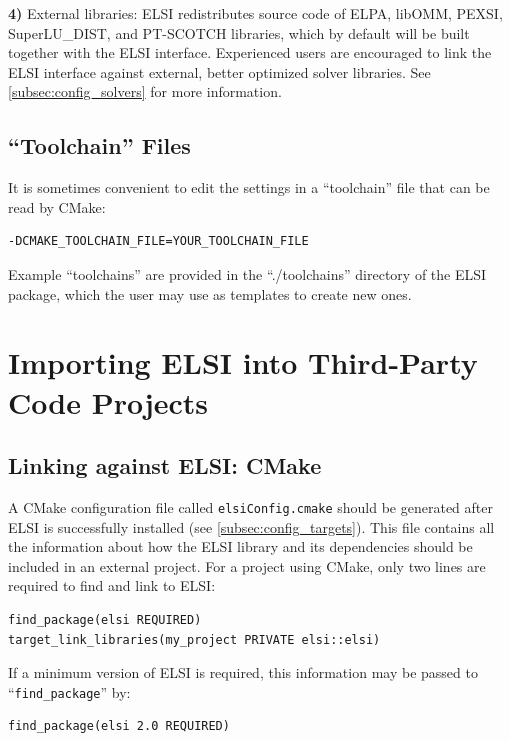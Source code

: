 \documentclass{report}
\begin{document}
\textbf{4)} External libraries:  ELSI redistributes source code of ELPA, libOMM, PEXSI, SuperLU\_DIST, and PT-SCOTCH libraries, which by default will be built together with the ELSI interface.  Experienced users are encouraged to link the ELSI interface against external, better optimized solver libraries.  See \ref{subsec:config_solvers} for more information.

\subsection{``Toolchain'' Files}
\label{subsec:config_toolchain}
It is sometimes convenient to edit the settings in a ``toolchain'' file that can be read by CMake:
\begin{tcolorbox}
\begin{verbatim}
-DCMAKE_TOOLCHAIN_FILE=YOUR_TOOLCHAIN_FILE
\end{verbatim}
\end{tcolorbox}

Example ``toolchains'' are provided in the ``./toolchains'' directory of the ELSI package, which the user may use as templates to create new ones.

\section{Importing ELSI into Third-Party Code Projects}
\label{sec:import}
\subsection{Linking against ELSI:  CMake}
\label{subsec:import_cmake}
A CMake configuration file called \texttt{elsiConfig.cmake} should be generated after ELSI is successfully installed (see \ref{subsec:config_targets}).  This file contains all the information about how the ELSI library and its dependencies should be included in an external project.  For a project using CMake, only two lines are required to find and link to ELSI:
\begin{tcolorbox}
\begin{verbatim}
find_package(elsi REQUIRED)
target_link_libraries(my_project PRIVATE elsi::elsi)
\end{verbatim}
\end{tcolorbox}

If a minimum version of ELSI is required, this information may be passed to ``\verb+find_package+'' by:
\begin{tcolorbox}
\begin{verbatim}
find_package(elsi 2.0 REQUIRED)
\end{verbatim}
\end{tcolorbox}
\end{document}
